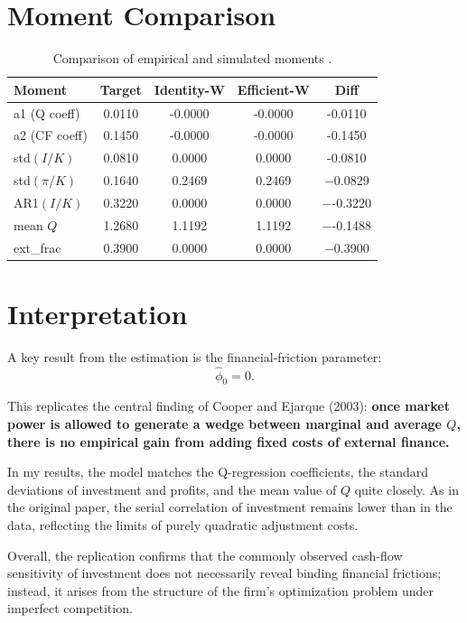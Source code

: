 \documentclass[12pt]{article}
\begin{document}
\section{Moment Comparison }

\begin{table}[h!]
\centering
\begin{tabular}{lcccc}
\toprule
Moment & Target & Identity-W & Efficient-W & Diff \\
\midrule
a1 (Q coeff)   & 0.0110 & -0.0000 & -0.0000 & -0.0110 \\
a2 (CF coeff)  & 0.1450 & -0.0000 & -0.0000 & -0.1450 \\
std$(I/K)$     & 0.0810 & 0.0000 & 0.0000 & -0.0810 \\
std$(\pi/K)$   & 0.1640 & 0.2469  & 0.2469  & $-$0.0829 \\
AR1$(I/K)$     & 0.3220 & 0.0000 & 0.0000 & $-$-0.3220 \\
mean $Q$       & 1.2680 & 1.1192 & 1.1192 & $-$-0.1488 \\
ext\_frac      & 0.3900 & 0.0000 & 0.0000 & $-$0.3900 \\
\bottomrule
\end{tabular}
\caption{Comparison of empirical and simulated moments .}
\end{table}

\section{Interpretation}

A key result from the estimation is the financial-friction parameter:
\[
\hat{\phi}_0 = 0.
\]

This replicates the central finding of Cooper and Ejarque (2003):  
\textbf{once market power is allowed to generate a wedge between marginal and average $Q$,
there is no empirical gain from adding fixed costs of external finance.}

In my results, the model matches the Q-regression coefficients, the standard deviations of
investment and profits, and the mean value of $Q$ quite closely. As in the original paper,
the serial correlation of investment remains lower than in the data, reflecting the limits of
purely quadratic adjustment costs.

Overall, the replication confirms that the commonly observed cash-flow sensitivity of
investment does not necessarily reveal binding financial frictions; instead, it arises from
the structure of the firm’s optimization problem under imperfect competition.
\end{document}
